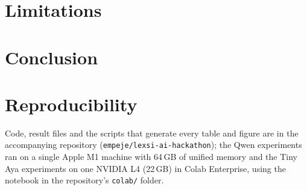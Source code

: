 \documentclass[conference]{IEEEtran}
\begin{document}


\section{Limitations}


\section{Conclusion}


\section*{Reproducibility}
Code, result files and the scripts that generate every table and figure are in the accompanying repository (\texttt{empeje/lexsi-ai-hackathon}); the Qwen experiments ran on a single Apple M1 machine with 64\,GB of unified memory and the Tiny Aya experiments on one NVIDIA L4 (22\,GB) in Colab Enterprise, using the notebook in the repository's \texttt{colab/} folder.
\end{document}
